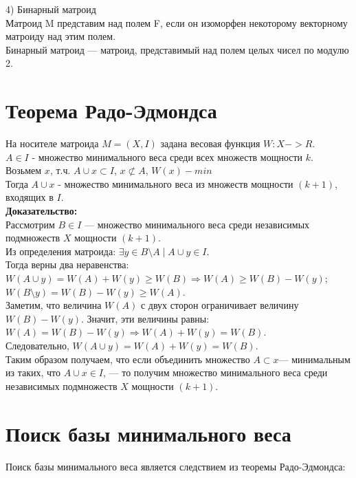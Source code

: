 \documentclass[a4paper,12pt]{article}
\begin{document}
4)	Бинарный матроид\\
Матроид M представим над полем F, если он изоморфен некоторому векторному матроиду над этим полем.\\
Бинарный матроид — матроид, представимый над полем целых чисел по модулю 2.

\section{Теорема Радо-Эдмондса} 
На носителе матроида $M=(X,I)$ задана весовая функция $W:X->R$.\\
$A\in I$ - множество минимального веса среди всех множеств мощности $k$.\\
Возьмем $x$, т.ч.  $A\cup x \subset I$, $x \not \subset A$, $W(x)-min$\\

Тогда  $A\cup x$ - множество минимального веса из множеств мощности $(k+1)$, входящих в $I$.\\

\textbf{Доказательство:}\\

Рассмотрим $B\in I$ — множество минимального веса среди независимых подмножеств $X$ мощности $(k+1)$.\\

Из определения матроида: $\exists y \in B\setminus A \mid A \cup y \in I$.\\

Тогда верны два неравенства:\\
$W(A\cup y)=W(A)+W(y) \geq W(B)\Rightarrow W(A) \geq W(B)-W(y)$;\\
$W(B \setminus y)=W(B)-W(y) \geq W(A)$.\\

Заметим, что величина $W(A)$ с двух сторон ограничивает величину $W(B)−W(y)$. Значит, эти величины равны: $W(A)=W(B)-W(y) \Rightarrow W(A)+W(y)=W(B)$.\\

Следовательно, $W(A\cup y)=W(A)+W(y)=W(B)$.\\

Таким образом получаем, что если объединить множество $A \subset x$— минимальным из таких, что $A\cup x \in I$, — то получим множество минимального веса среди независимых подмножеств $X$ мощности $(k+1)$.

\section{Поиск базы минимального веса} 
Поиск базы минимального веса является следствием из теоремы Радо-Эдмондса:\\
\end{document}

